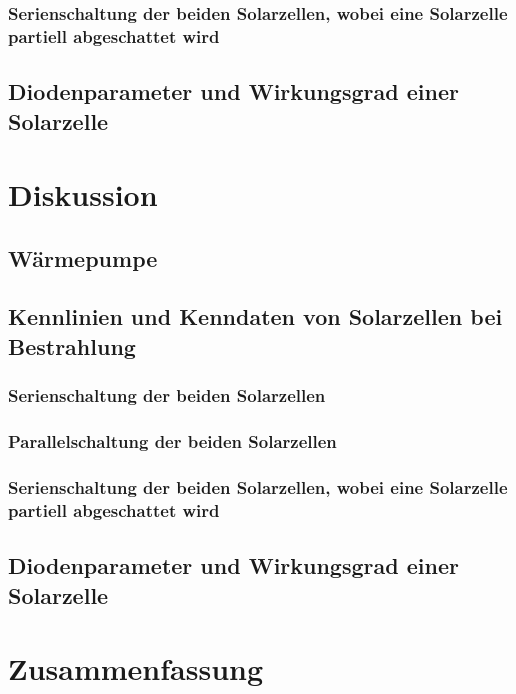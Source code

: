 \documentclass[12pt,english,ngerman]{scrartcl}
\begin{document}
\subsubsection{Serienschaltung der beiden Solarzellen, wobei eine Solarzelle partiell abgeschattet wird}

\subsection{Diodenparameter und Wirkungsgrad einer Solarzelle}






\section{Diskussion}\label{sec:diskussion}

\subsection{Wärmepumpe}

\subsection{Kennlinien und Kenndaten von Solarzellen bei Bestrahlung}

\subsubsection{Serienschaltung der beiden Solarzellen}

\subsubsection{Parallelschaltung der beiden Solarzellen}


\subsubsection{Serienschaltung der beiden Solarzellen, wobei eine Solarzelle partiell abgeschattet wird}

\subsection{Diodenparameter und Wirkungsgrad einer Solarzelle}



\section{Zusammenfassung}\label{sec:zusammenfassung}
\end{document}
